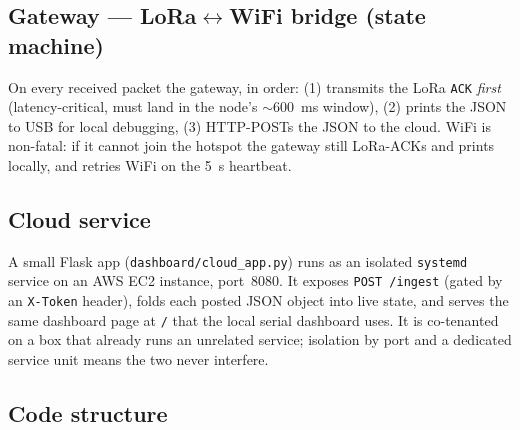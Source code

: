 \documentclass[11pt,a4paper]{article}
\begin{document}
\subsection{Gateway --- LoRa$\leftrightarrow$WiFi bridge (state machine)}

On every received packet the gateway, in order: (1) transmits the LoRa
\texttt{ACK} \emph{first} (latency-critical, must land in the node's
$\sim$600~ms window), (2) prints the JSON to USB for local debugging,
(3) HTTP-POSTs the JSON to the cloud. WiFi is non-fatal: if it cannot
join the hotspot the gateway still LoRa-ACKs and prints locally, and
retries WiFi on the 5~s heartbeat.

\begin{center}
\end{center}

\subsection{Cloud service}

A small Flask app (\texttt{dashboard/cloud\_app.py}) runs as an isolated
\texttt{systemd} service on an AWS EC2 instance, port~8080. It exposes
\texttt{POST /ingest} (gated by an \texttt{X-Token} header), folds each
posted JSON object into live state, and serves the same dashboard page
at \texttt{/} that the local serial dashboard uses. It is co-tenanted
on a box that already runs an unrelated service; isolation by port and
a dedicated service unit means the two never interfere.

\subsection{Code structure}
\end{document}
